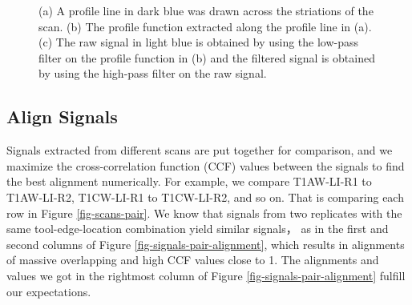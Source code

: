 \documentclass[fleqn,10pt]{wlscirep}
\begin{document}
\begin{figure}
\begin{minipage}{0.50\linewidth}
{}

\subcaption{\label{fig-T1AW-LI-R1-signals-plot}}

\end{minipage}%

\caption{\label{fig-T1AW-LI-R1-profiles-signals}(a) A profile line in
dark blue was drawn across the striations of the scan. (b) The profile
function extracted along the profile line in (a). (c) The raw signal in
light blue is obtained by using the low-pass filter on the profile
function in (b) and the filtered signal is obtained by using the
high-pass filter on the raw signal.}

\end{figure}%

\subsection*{Align Signals}\label{sec-align-signals}

Signals extracted from different scans are put together for comparison,
and we maximize the cross-correlation function (CCF) values between the
signals to find the best alignment numerically. For example, we compare
T1AW-LI-R1 to T1AW-LI-R2, T1CW-LI-R1 to T1CW-LI-R2, and so on. That is
comparing each row in Figure \ref{fig-scans-pair}. We know that signals
from two replicates with the same tool-edge-location combination yield
similar signals， as in the first and second columns of Figure
\ref{fig-signals-pair-alignment}, which results in alignments of massive
overlapping and high CCF values close to 1. The alignments and values we
got in the rightmost column of Figure \ref{fig-signals-pair-alignment}
fulfill our expectations.
\end{document}
